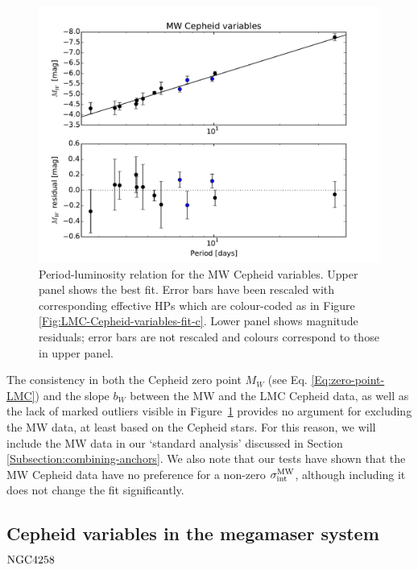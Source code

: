 \begin{figure}[tbp]
\centering %
\includegraphics[width=\textwidth]{figures/chapter-h0/effective_HP_cepheids_MW.pdf} 
\caption{Period-luminosity relation for the MW Cepheid variables. Upper panel shows the best fit. Error bars have been rescaled with corresponding effective HPs which are colour-coded as in Figure \ref{Fig:LMC-Cepheid-variables-fit-c}. Lower panel shows magnitude residuals; error bars are not rescaled and colours correspond to those in upper panel.}
\label{Fig:MW-Cepheid-variables}
\end{figure}

The consistency in both the Cepheid zero point $M_W$ (see Eq. \eqref{Eq:zero-point-LMC}) and the slope $b_W$ between the MW and the LMC Cepheid data, as well as the lack of marked outliers visible in Figure\ \ref{Fig:MW-Cepheid-variables} provides no argument for excluding the MW data, at least based on the Cepheid stars. For this reason, we will include the MW data in our `standard analysis' discussed in Section \ref{Subsection:combining-anchors}. We also note that our tests have shown that the MW Cepheid data have no preference for a non-zero $\sigma^{\mathrm{MW}}_{\mathrm{int}}$, although including it does not change the fit significantly.

\subsection{Cepheid variables in the megamaser system\\
 $\mathrm{NGC4258}$}
\label{Subsection:NGC4258}


